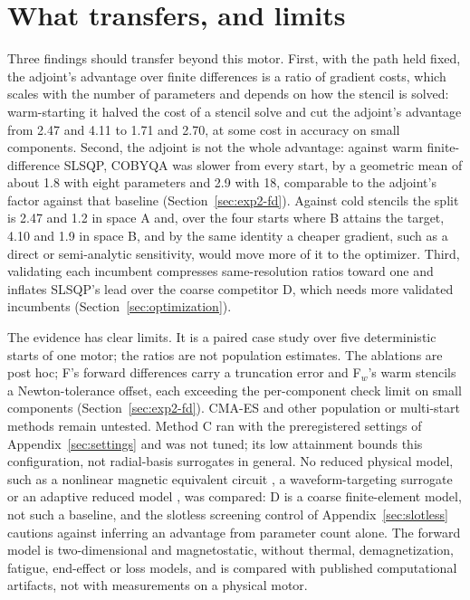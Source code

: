 \documentclass{anvil-paper}
\begin{document}
\section{What transfers, and limits}\label{sec:discussion}
Three findings should transfer beyond this motor. First, with the path
held fixed, the adjoint's advantage over finite differences is a ratio of
gradient costs, which scales with the number of parameters and depends on
how the stencil is solved: warm-starting it halved the cost of a stencil
solve and cut the adjoint's advantage from 2.47 and 4.11 to 1.71 and 2.70,
at some cost in accuracy on small components. Second,
the adjoint is not the whole advantage: against warm finite-difference
SLSQP, COBYQA was slower from every start, by a geometric mean of about 1.8
with eight parameters and 2.9 with 18, comparable to the adjoint's factor
against that baseline (Section~\ref{sec:exp2-fd}). Against cold
stencils the split is 2.47 and 1.2 in space A and, over the four starts
where B attains the target, 4.10 and 1.9 in space B,
and by the same identity a cheaper gradient, such as a direct or
semi-analytic sensitivity, would move more of it to the optimizer. Third, validating
each incumbent compresses same-resolution ratios toward one and inflates
SLSQP's lead over the coarse competitor D, which needs more validated
incumbents (Section~\ref{sec:optimization}).

The evidence has clear limits. It is a paired case study over five
deterministic starts of one motor; the ratios are not population estimates.
The ablations are post hoc; F's forward differences carry a truncation
error and F$_w$'s warm stencils a Newton-tolerance offset, each exceeding the
per-component check limit on small components (Section~\ref{sec:exp2-fd}). CMA-ES and other population or
multi-start methods remain untested.
Method C ran with the preregistered settings of
Appendix~\ref{sec:settings} and was not tuned; its low attainment bounds
this configuration, not radial-basis surrogates in general. No reduced
physical model, such as a nonlinear magnetic equivalent circuit
\citep{kemmetmueller2015}, a waveform-targeting surrogate \citep{roomi2022}
or an adaptive reduced model \citep{wen2023}, was compared: D is a coarse finite-element model, not such a baseline, and
the slotless screening control of Appendix~\ref{sec:slotless} cautions
against inferring an advantage from parameter count alone. The forward model is two-dimensional and
magnetostatic, without thermal, demagnetization, fatigue, end-effect or
loss models, and is compared with published computational artifacts, not
with measurements on a physical motor.
\end{document}
